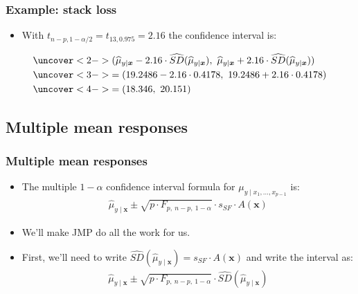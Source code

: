 \documentclass[handout]{beamer}\usepackage[]{graphicx}\usepackage[]{color}
\providecommand{\vc}[1]{\boldsymbol{#1}}
\providecommand{\wh}[1]{\widehat{#1}}
\numberwithin{equation}{section}
\begin{document}
\begin{frame}
\frametitle{Example: stack loss}
\begin{itemize}
\item With $t_{n - p, 1 - \alpha/2} = t_{13, 0.975} = 2.16$ the confidence interval is:
\end{itemize}
\begin{align*}
&\uncover<2->{(\wh{\mu}_{y \mid \vc{x}} - 2.16 \cdot \wh{SD}(\wh{\mu}_{y \mid \vc{x}}), \ \wh{\mu}_{y \mid \vc{x}} + 2.16 \cdot \wh{SD}(\wh{\mu}_{y \mid \vc{x}}))} \\
&\uncover<3->{= (19.2486 - 2.16 \cdot 0.4178, \ 19.2486 + 2.16 \cdot 0.4178)} \\
&\uncover<4->{= (18.346, \ 20.151)}
\end{align*}
\begin{itemize}
\end{itemize}
\end{frame}



\subsection{Multiple mean responses}

\begin{frame}
\frametitle{Multiple mean responses}
\begin{itemize}
\item The multiple $1 - \alpha$ confidence interval formula for $\mu_{y \mid x_1, \ldots, x_{p-1}}$ is:
\begin{align*}
\wh{\mu}_{y \mid \vc{x}} \pm \sqrt{p \cdot F_{p, \ n - p, \ 1 - \alpha }} \cdot s_{SF} \cdot A(\vc{x})
\end{align*}
\pause \item We'll make JMP do all the work for us.
\pause \item First, we'll need to write $\wh{SD}(\wh{\mu}_{y \mid \vc{x}}) = s_{SF} \cdot A(\vc{x})$ and write the interval as:
\begin{align*}
\wh{\mu}_{y \mid \vc{x}} \pm \sqrt{p \cdot F_{p, \ n - p, \ 1 - \alpha}} \cdot \wh{SD}(\wh{\mu}_{y \mid \vc{x}})
\end{align*}
\end{itemize}
\end{frame}
\end{document}
